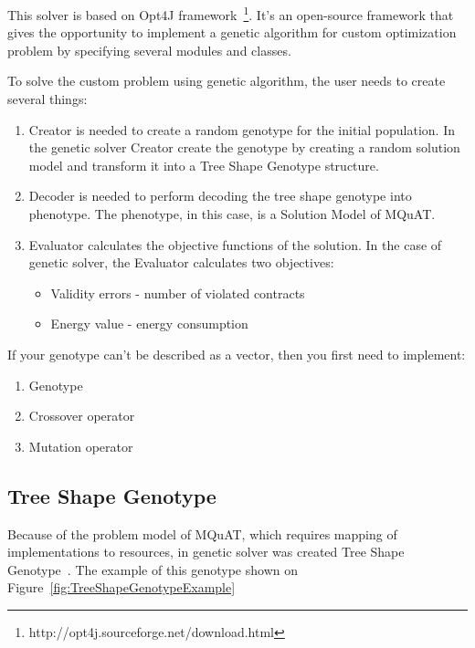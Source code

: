 This solver is based on Opt4J framework~\footnote{http://opt4j.sourceforge.net/download.html}. It's an open-source framework that gives the opportunity to implement a genetic algorithm for custom optimization problem by specifying several modules and classes.

To solve the custom problem using genetic algorithm, the user needs to create several things:

\begin{enumerate}
	\item Creator is needed to create a random genotype for the initial population.
	In the genetic solver Creator create the genotype by creating a random solution model and transform it into a Tree Shape Genotype structure.
	\item Decoder is needed to perform decoding the tree shape genotype into phenotype. The phenotype, in this case, is a Solution Model of MQuAT.
	\item Evaluator calculates the objective functions of the solution. In the case of genetic solver, the Evaluator calculates two objectives: 
	
	\begin{itemize}
		\item Validity errors - number of violated contracts
		\item Energy value - energy consumption
	\end{itemize}
	
\end{enumerate}

If your genotype can't be described as a vector, then you first need to implement:

\begin{enumerate}
	\item Genotype
	\item Crossover operator
	\item Mutation operator
\end{enumerate}

\subsection{Tree Shape Genotype}

Because of the problem model of MQuAT, which requires mapping of implementations to resources, in genetic solver was created Tree Shape Genotype~\cite{ahmad18}.
The example of this genotype shown on Figure~\ref{fig:TreeShapeGenotypeExample}


